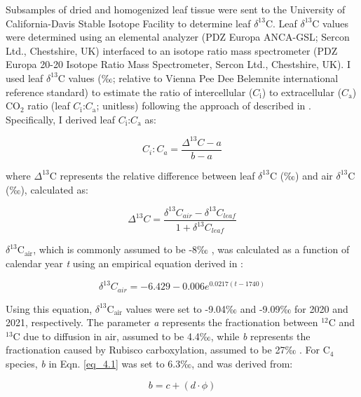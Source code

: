 Subsamples of dried and homogenized leaf tissue were sent to the University of California-Davis Stable Isotope Facility to determine leaf $\delta^{13}$C. Leaf $\delta^{13}$C values were determined using an elemental analyzer (PDZ Europa ANCA-GSL; Sercon Ltd., Chestshire, UK) interfaced to an isotope ratio mass spectrometer (PDZ Europa 20-20 Isotope Ratio Mass Spectrometer, Sercon Ltd., Chestshire, UK). I used leaf $\delta^{13}$C values (‰; relative to Vienna Pee Dee Belemnite international reference standard) to estimate the ratio of intercellular ($C_\mathrm{i}$) to extracellular ($C_\mathrm{a}$) CO$_2$ ratio (leaf $C_\mathrm{i}$:$C_\mathrm{a}$; unitless) following the approach of  described in . Specifically, I derived leaf $C_\mathrm{i}$:$C_\mathrm{a}$ as:

\begin{equation} 
    \label{eq_4.1}
    C_i:C_a = \frac{\Delta^{13}C - a}{b - a}
\end{equation}
    
\noindent where $\Delta^{13}$C represents the relative difference between leaf $\delta^{13}$C (‰) and air $\delta^{13}$C (‰), calculated as:

\begin{equation}
    \label{eq_4.2}
    \Delta^{13}C = \frac{\delta^{13}C_{air} - \delta^{13}C_{leaf}}{1 + \delta^{13}C_{leaf}}
\end{equation}

\noindent $\delta^{13}\mathrm{C_{air}}$, which is commonly assumed to be -8‰ , was calculated as a function of calendar year \textit{t} using an empirical equation derived in :

\begin{equation}
    \label{eq_4.3}
    \delta^{13}C_{air} = -6.429 - 0.006e^{0.0217(t-1740)}
\end{equation}
    
 \noindent Using this equation, $\delta^{13}\mathrm{C_{air}}$ values were set to -9.04‰ and -9.09‰ for 2020 and 2021, respectively. The parameter \textit{a} represents the fractionation between $^{12}$C and $^{13}$C due to diffusion in air, assumed to be 4.4‰, while \textit{b} represents the fractionation caused by Rubisco carboxylation, assumed to be 27‰ . For C$_4$ species, \textit{b} in Eqn. \ref{eq_4.1} was set to 6.3‰, and was derived from:

\begin{equation}
    \label{eq_4.4}
    b = c + (d \cdot \phi)
\end{equation}
    
